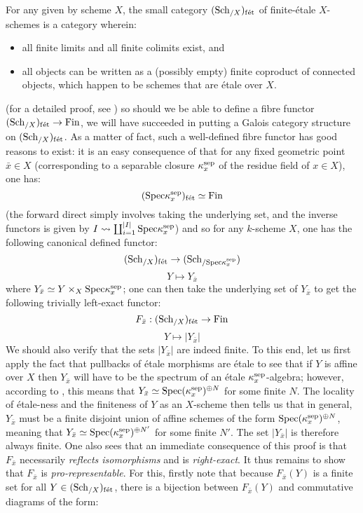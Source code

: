         \begin{remark} \label{remark: finite_etale_schemes}
            For any given by scheme $X$, the small category $(\mathrm{Sch}_{/X})_{\mathrm{f\acute{e}t}}$ of finite-\'etale $X$-schemes is a category wherein:
                \begin{itemize}
                    \item all finite limits and all finite colimits exist, and
                    \item all objects can be written as a (possibly empty) finite coproduct of connected objects, which happen to be schemes that are \'etale over $X$.  
                \end{itemize}
            (for a detailed proof, see \cite[\href{https://stacks.math.columbia.edu/tag/0BN9}{Tag 0BN9}]{stacks}) so should we be able to define a fibre functor $(\mathrm{Sch}_{/X})_{\mathrm{f\acute{e}t}} \to \mathrm{Fin}$, we will have succeeded in putting a Galois category structure on $(\mathrm{Sch}_{/X})_{\mathrm{f\acute{e}t}}$. As a matter of fact, such a well-defined fibre functor has good reasons to exist: it is an easy consequence of \cite[\href{https://stacks.math.columbia.edu/tag/00U3}{Tag 00U3}]{stacks} that for any fixed geometric point $\bar{x} \in X$ (corresponding to a separable closure $\kappa_x^{\mathrm{sep}}$ of the residue field of $x \in X$), one has:
                $$(\mathrm{Spec} \kappa_x^{\mathrm{sep}})_{\mathrm{f\acute{e}t}} \simeq \mathrm{Fin}$$
            (the forward direct simply involves taking the underlying set, and the inverse functors is given by $I \leadsto \coprod_{i = 1}^{|I|} \mathrm{Spec} \kappa_x^{\mathrm{sep}}$) and so for any $k$-scheme $X$, one has the following canonical defined functor:
                $$(\mathrm{Sch}_{/X})_{\mathrm{f\acute{e}t}} \to (\mathrm{Sch}_{/\mathrm{Spec} \kappa_x^{\mathrm{sep}}})$$
                $$Y \mapsto Y_{\bar{x}}$$
            where $Y_{\bar{x}} \cong Y \x_X \Spec \kappa_x^{\sep}$; one can then take the underlying set of $Y_{\bar{x}}$ to get the following trivially left-exact functor:
                $$F_{\bar{x}}: (\mathrm{Sch}_{/X})_{\mathrm{f\acute{e}t}} \to \mathrm{Fin}$$
                $$Y \mapsto |Y_{\bar{x}}|$$
            We should also verify that the sets $|Y_{\bar{x}}|$ are indeed finite. To this end, let us first apply the fact that pullbacks of \'etale morphisms are \'etale to see that if $Y$ is affine over $X$ then $Y_{\bar{x}}$ will have to be the spectrum of an \'etale $\kappa_x^{\mathrm{sep}}$-algebra; however, according to \cite[\href{https://stacks.math.columbia.edu/tag/00U3}{Tag 00U3}]{stacks}, this means that $Y_{\bar{x}} \simeq \mathrm{Spec} (\kappa_x^{\mathrm{sep}})^{\oplus N}$ for some finite $N$. The locality of \'etale-ness and the finiteness of $Y$ as an $X$-scheme then tells us that in general, $Y_{\bar{x}}$ must be a finite disjoint union of affine schemes of the form $\mathrm{Spec} (\kappa_x^{\mathrm{sep}})^{\oplus N}$, meaning that $Y_{\bar{x}} \simeq \mathrm{Spec} (\kappa_x^{\mathrm{sep}})^{\oplus N'}$ for some finite $N'$. The set $|Y_{\bar{x}}|$ is therefore always finite. One also sees that an immediate consequence of this proof is that $F_{\bar{x}}$ necessarily \textit{reflects isomorphisms} and is \textit{right-exact}. It thus remains to show that $F_{\bar{x}}$ is \textit{pro-representable}. For this, firstly note that because $F_{\bar{x}}(Y)$ is a finite set for all $Y \in (\mathrm{Sch}_{/X})_{\mathrm{f\acute{e}t}}$, there is a bijection between $F_{\bar{x}}(Y)$ and commutative diagrams of the form:

\end{remark}
